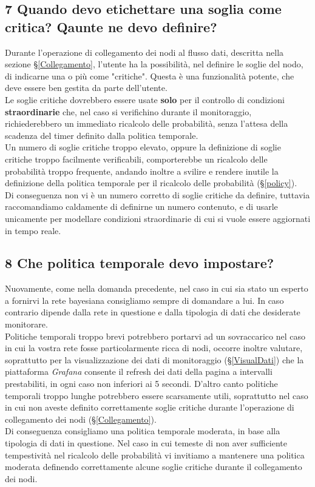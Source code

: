 \subsection*{7 Quando devo etichettare una soglia come critica? Qaunte ne devo definire?}
Durante l'operazione di collegamento dei nodi al flusso dati, descritta nella sezione §\ref{Collegamento}, l'utente ha la possibilità, nel definire le soglie del nodo, di indicarne una o più come "critiche". Questa è una funzionalità potente, che deve essere ben gestita da parte dell'utente.\\
Le soglie critiche dovrebbero essere usate \textbf{solo} per il controllo di condizioni \textbf{straordinarie} che, nel caso si verifichino durante il monitoraggio, richiederebbero un immediato ricalcolo delle probabilità, senza l'attesa della scadenza del timer definito dalla politica temporale.\\
Un numero di soglie critiche troppo elevato, oppure la definizione di soglie critiche troppo facilmente verificabili, comporterebbe un ricalcolo delle probabilità troppo frequente, andando inoltre a svilire e rendere inutile la definizione della politica temporale per il ricalcolo delle probabilità (§\ref{policy}).\\
Di conseguenza non vi è un numero corretto di soglie critiche da definire, tuttavia raccomandiamo caldamente di definirne un numero contenuto, e di usarle unicamente per modellare condizioni straordinarie di cui si vuole essere aggiornati in tempo reale.

\subsection*{8 Che politica temporale devo impostare?}
Nuovamente, come nella domanda precedente, nel caso in cui sia stato un esperto a fornirvi la rete bayesiana consigliamo sempre di domandare a lui. In caso contrario dipende dalla rete in questione e dalla tipologia di dati che desiderate monitorare.\\
Politiche temporali troppo brevi potrebbero portarvi ad un sovraccarico nel caso in cui la vostra rete fosse particolarmente ricca di nodi, occorre inoltre valutare, soprattutto per la visualizzazione dei dati di monitoraggio (§\ref{VisualDati}) che la piattaforma \textit{Grafana} consente il refresh dei dati della pagina a intervalli prestabiliti, in ogni caso non inferiori ai 5 secondi. D'altro canto politiche temporali troppo lunghe potrebbero essere scarsamente utili, soprattutto nel caso in cui non aveste definito correttamente soglie critiche durante l'operazione di collegamento dei nodi (§\ref{Collegamento}).\\
Di conseguenza consigliamo una politica temporale moderata, in base alla tipologia di dati in questione. Nel caso in cui temeste di non aver sufficiente tempestività nel ricalcolo delle probabilità vi invitiamo a mantenere una politica moderata definendo correttamente alcune soglie critiche durante il collegamento dei nodi.

